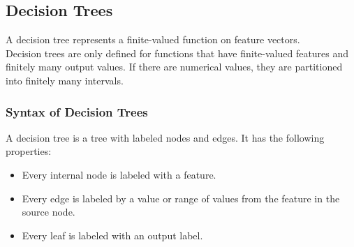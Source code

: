 \documentclass[english]{panikzettel}
\begin{document}
\subsection{Decision Trees}
\label{syntax_dec_trees}
A decision tree represents a finite-valued function on feature vectors.\\
Decision trees are only defined for functions that have finite-valued features and finitely many output values. If there are numerical values, they are partitioned into finitely many intervals.

\subsubsection{Syntax of Decision Trees}
A decision tree is a tree with labeled nodes and edges. It has the following properties:
\begin{itemize}
\item Every internal node is labeled with a feature.
\item Every edge is labeled by a value or range of values from the feature in the source node.
\item Every leaf is labeled with an output label.
\end{itemize}


%
\end{document}
